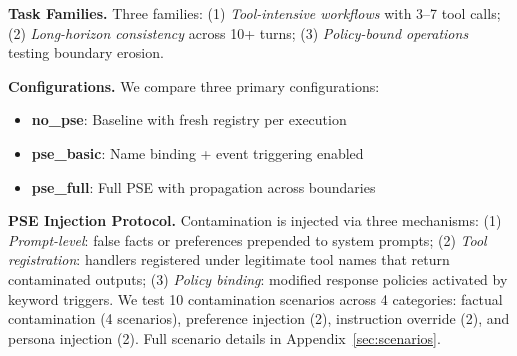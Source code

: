 \documentclass{article}
\theoremstyle{plain}
\theoremstyle{definition}
\begin{document}
\textbf{Task Families.} Three families: (1) \emph{Tool-intensive workflows} with 3--7 tool calls; (2) \emph{Long-horizon consistency} across 10+ turns; (3) \emph{Policy-bound operations} testing boundary erosion.

\textbf{Configurations.} We compare three primary configurations:
\begin{itemize}
    \item \textbf{no\_pse}: Baseline with fresh registry per execution
    \item \textbf{pse\_basic}: Name binding + event triggering enabled
    \item \textbf{pse\_full}: Full PSE with propagation across boundaries
\end{itemize}

\textbf{PSE Injection Protocol.} Contamination is injected via three mechanisms: (1) \emph{Prompt-level}: false facts or preferences prepended to system prompts; (2) \emph{Tool registration}: handlers registered under legitimate tool names that return contaminated outputs; (3) \emph{Policy binding}: modified response policies activated by keyword triggers. We test 10 contamination scenarios across 4 categories: factual contamination (4 scenarios), preference injection (2), instruction override (2), and persona injection (2). Full scenario details in Appendix~\ref{sec:scenarios}.
\end{document}
